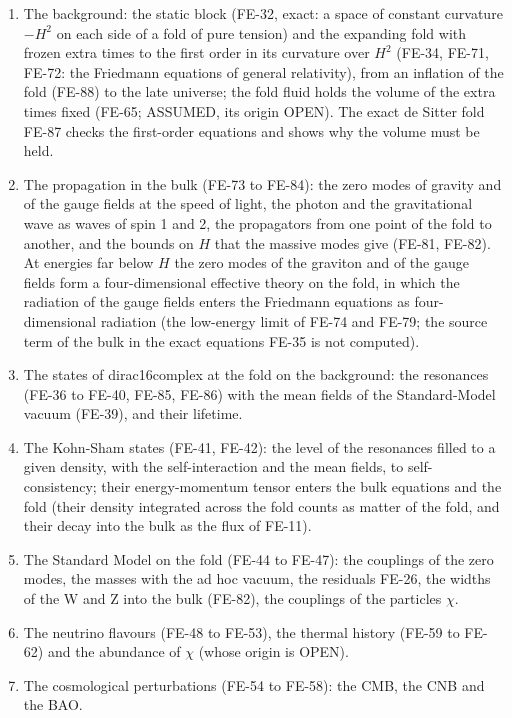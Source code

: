 \documentclass[
  10pt,
]{article}
\providecommand{\tightlist}{%
  \setlength{\itemsep}{0pt}\setlength{\parskip}{0pt}}
\begin{document}
\begin{enumerate}
\def\labelenumi{\arabic{enumi}.}
\tightlist
\item
  The background: the static block (FE-32, exact: a space of constant
  curvature \(-H^2\) on each side of a fold of pure tension) and the
  expanding fold with frozen extra times to the first order in its
  curvature over \(H^2\) (FE-34, FE-71, FE-72: the Friedmann equations
  of general relativity), from an inflation of the fold (FE-88) to the
  late universe; the fold fluid holds the volume of the extra times
  fixed (FE-65; ASSUMED, its origin OPEN). The exact de Sitter fold
  FE-87 checks the first-order equations and shows why the volume must
  be held.
\item
  The propagation in the bulk (FE-73 to FE-84): the zero modes of
  gravity and of the gauge fields at the speed of light, the photon and
  the gravitational wave as waves of spin 1 and 2, the propagators from
  one point of the fold to another, and the bounds on \(H\) that the
  massive modes give (FE-81, FE-82). At energies far below \(H\) the
  zero modes of the graviton and of the gauge fields form a
  four-dimensional effective theory on the fold, in which the radiation
  of the gauge fields enters the Friedmann equations as four-dimensional
  radiation (the low-energy limit of FE-74 and FE-79; the source term of
  the bulk in the exact equations FE-35 is not computed).
\item
  The states of dirac16complex at the fold on the background: the
  resonances (FE-36 to FE-40, FE-85, FE-86) with the mean fields of the
  Standard-Model vacuum (FE-39), and their lifetime.
\item
  The Kohn-Sham states (FE-41, FE-42): the level of the resonances
  filled to a given density, with the self-interaction and the mean
  fields, to self-consistency; their energy-momentum tensor enters the
  bulk equations and the fold (their density integrated across the fold
  counts as matter of the fold, and their decay into the bulk as the
  flux of FE-11).
\item
  The Standard Model on the fold (FE-44 to FE-47): the couplings of the
  zero modes, the masses with the ad hoc vacuum, the residuals FE-26,
  the widths of the W and Z into the bulk (FE-82), the couplings of the
  particles \(\chi\).
\item
  The neutrino flavours (FE-48 to FE-53), the thermal history (FE-59 to
  FE-62) and the abundance of \(\chi\) (whose origin is OPEN).
\item
  The cosmological perturbations (FE-54 to FE-58): the CMB, the CNB and
  the BAO.
\end{enumerate}
\end{document}
